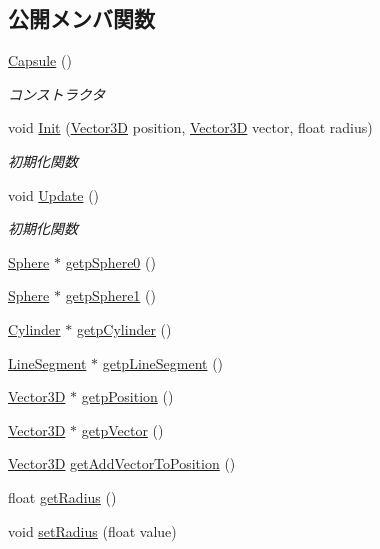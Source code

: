 \subsection*{公開メンバ関数}
\begin{DoxyCompactItemize}
\item 
\mbox{\hyperlink{class_capsule_a4324279c9cc08241083b53c3a3dec44c}{Capsule}} ()
\begin{DoxyCompactList}\small\item\em コンストラクタ \end{DoxyCompactList}\item 
void \mbox{\hyperlink{class_capsule_a89dc585afa88e50e84a2f98bbf0bb400}{Init}} (\mbox{\hyperlink{class_vector3_d}{Vector3D}} position, \mbox{\hyperlink{class_vector3_d}{Vector3D}} vector, float radius)
\begin{DoxyCompactList}\small\item\em 初期化関数 \end{DoxyCompactList}\item 
void \mbox{\hyperlink{class_capsule_af53f19ae224208814b21238c3661a643}{Update}} ()
\begin{DoxyCompactList}\small\item\em 初期化関数 \end{DoxyCompactList}\item 
\mbox{\hyperlink{class_sphere}{Sphere}} $\ast$ \mbox{\hyperlink{class_capsule_a21069589808b846bced97f00beb6d156}{getp\+Sphere0}} ()
\item 
\mbox{\hyperlink{class_sphere}{Sphere}} $\ast$ \mbox{\hyperlink{class_capsule_a5a1ee83c8ff8136d361864bcda8138ca}{getp\+Sphere1}} ()
\item 
\mbox{\hyperlink{class_cylinder}{Cylinder}} $\ast$ \mbox{\hyperlink{class_capsule_ae5826ff4d2d894c8e0d0bd65de5f05ca}{getp\+Cylinder}} ()
\item 
\mbox{\hyperlink{class_line_segment}{Line\+Segment}} $\ast$ \mbox{\hyperlink{class_capsule_a84ddec064afb6b2fff155a10e9e26191}{getp\+Line\+Segment}} ()
\item 
\mbox{\hyperlink{class_vector3_d}{Vector3D}} $\ast$ \mbox{\hyperlink{class_capsule_afc99a1883241c44d0bf5f4deb5f3cb92}{getp\+Position}} ()
\item 
\mbox{\hyperlink{class_vector3_d}{Vector3D}} $\ast$ \mbox{\hyperlink{class_capsule_a1793de155de657088c546727b393367a}{getp\+Vector}} ()
\item 
\mbox{\hyperlink{class_vector3_d}{Vector3D}} \mbox{\hyperlink{class_capsule_a32991dc5e0331f716302ce73a8f9fd2f}{get\+Add\+Vector\+To\+Position}} ()
\item 
float \mbox{\hyperlink{class_capsule_a4e98e8545ea57fe682c5a2002bd49bdb}{get\+Radius}} ()
\item 
void \mbox{\hyperlink{class_capsule_a42d2233293d60384377ab4f4213be612}{set\+Radius}} (float value)
\end{DoxyCompactItemize}
